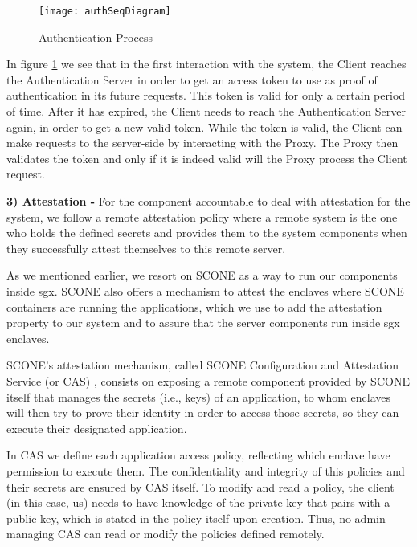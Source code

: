 \vspace{3mm}

\begin{figure}[htbp]
	\centering
	{\texttt{[image: authSeqDiagram]}}
	\caption{Authentication Process}
	\label{fig:authProcess}
\end{figure}

In figure \ref{fig:authProcess} we see that in the first interaction with the system, the Client reaches the Authentication Server in order to get an access token to use as proof of authentication in its future requests. This token is valid for only a certain period of time. After it has expired, the Client needs to reach the Authentication Server again, in order to get a new valid token. While the token is valid, the Client can make requests to the server-side by interacting with the Proxy. The Proxy then validates the token and only if it is indeed valid will the Proxy process the Client request.

\vspace{5mm} 

\textbf{3) Attestation -}
For the component accountable to deal with attestation for the system, we follow a remote attestation policy where a remote system is the one who holds the defined secrets and provides them to the system components when they successfully attest themselves to this remote server.

As we mentioned earlier, we resort on SCONE as a way to run our components inside \gls{sgx}. SCONE also offers a mechanism to attest the enclaves where SCONE containers are running the applications, which we use to add the attestation property to our system and to assure that the server components run inside \gls{sgx} enclaves. 

SCONE's attestation mechanism, called SCONE Configuration and Attestation Service (or CAS) \cite{sconeCAS}, consists on exposing a remote component provided by SCONE itself that manages the secrets (i.e., keys) of an application, to whom enclaves will then try to prove their identity in order to access those secrets, so they can execute their designated application. 

In CAS we define each application access policy, reflecting which enclave have permission to execute them. The confidentiality and integrity of this policies and their secrets are ensured by CAS itself. To modify and read a policy, the client (in this case, us) needs to have knowledge of the private key that pairs with a public key, which is stated in the policy itself upon creation. Thus, no admin managing CAS can read or modify the policies defined remotely.

